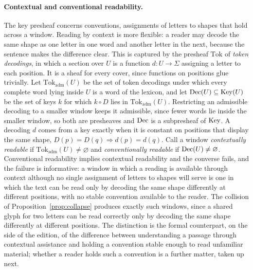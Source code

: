 \paragraph{Contextual and conventional readability.}
The key presheaf concerns conventions, assignments of letters to shapes that hold across a window. Reading by context is more flexible: a reader may decode the same shape as one letter in one word and another letter in the next, because the sentence makes the difference clear. This is captured by the presheaf $\mathrm{Tok}$ of \emph{token decodings}, in which a section over $U$ is a function $d:U\to\Sigma$ assigning a letter to each position. It is a sheaf for every cover, since functions on positions glue trivially. Let $\mathrm{Tok}_{\mathrm{adm}}(U)$ be the set of token decodings under which every complete word lying inside $U$ is a word of the lexicon, and let $\mathrm{Dec}(U)\subseteq\mathrm{Key}(U)$ be the set of keys $k$ for which $k\circ D$ lies in $\mathrm{Tok}_{\mathrm{adm}}(U)$. Restricting an admissible decoding to a smaller window keeps it admissible, since fewer words lie inside the smaller window, so both are presheaves and $\mathrm{Dec}$ is a subpresheaf of $\mathrm{Key}$. A decoding $d$ comes from a key exactly when it is constant on positions that display the same shape, $D(p)=D(q)\Rightarrow d(p)=d(q)$. Call a window \emph{contextually readable} if $\mathrm{Tok}_{\mathrm{adm}}(U)\ne\varnothing$ and \emph{conventionally readable} if $\mathrm{Dec}(U)\ne\varnothing$. Conventional readability implies contextual readability and the converse fails, and the failure is informative: a window in which a reading is available through context although no single assignment of letters to shapes will serve is one in which the text can be read only by decoding the same shape differently at different positions, with no stable convention available to the reader. The collision of Proposition~\ref{prop:collapse} produces exactly such windows, since a shared glyph for two letters can be read correctly only by decoding the same shape differently at different positions. The distinction is the formal counterpart, on the side of the edition, of the difference between understanding a passage through contextual assistance and holding a convention stable enough to read unfamiliar material; whether a reader holds such a convention is a further matter, taken up next.

